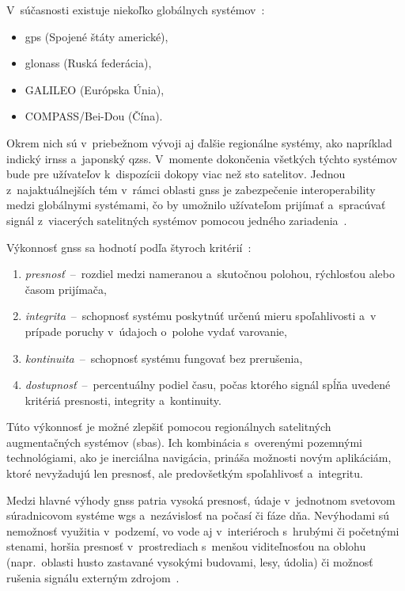     V~súčasnosti existuje niekoľko globálnych systémov~\cite{WhatGNSS}:
    \begin{itemize}
      \item \acrshort{gps} (Spojené štáty americké),
      \item \acrshort{glonass} (Ruská federácia),
      \item GALILEO (Európska Únia),
      \item COMPASS/Bei-Dou (Čína).
    \end{itemize}
    
    Okrem nich sú v~priebežnom vývoji aj ďalšie regionálne systémy, ako napríklad indický \acrshort{irnss} a~japonský \acrshort{qzss}. V~momente dokončenia všetkých týchto systémov bude pre užívateľov k~dispozícii dokopy viac než sto satelitov. Jednou z~najaktuálnejších tém v~rámci oblasti \acrshort{gnss} je zabezpečenie interoperability medzi globálnymi systémami, čo by umožnilo užívateľom prijímať a~spracúvať signál z~viacerých satelitných systémov pomocou jedného zariadenia~\cite{GNSS}.

    Výkonnosť \acrshort{gnss} sa hodnotí podľa štyroch kritérií~\cite{WhatGNSS}:
    \begin{enumerate}
      \item \emph{presnosť}~--~rozdiel medzi nameranou a~skutočnou polohou, rýchlosťou alebo časom prijímača,
      \item \emph{integrita}~--~schopnosť systému poskytnúť určenú mieru spoľahlivosti a~v prípade poruchy v~údajoch o~polohe vydať varovanie,
      \item \emph{kontinuita}~--~schopnosť systému fungovať bez prerušenia,
      \item \emph{dostupnosť}~--~percentuálny podiel času, počas ktorého signál spĺňa uvedené kritériá presnosti, integrity a~kontinuity.
    \end{enumerate}

    Túto výkonnosť je možné zlepšiť pomocou regionálnych satelitných augmentačných systémov (\acrshort{sbas}). Ich kombinácia s~overenými pozemnými technológiami, ako je inerciálna navigácia, prináša možnosti novým aplikáciám, ktoré nevyžadujú len presnosť, ale predovšetkým spoľahlivosť a~integritu.

    Medzi hlavné výhody \acrshort{gnss} patria vysoká presnosť, údaje v~jednotnom svetovom súradnicovom systéme \acrshort{wgs} a~nezávislosť na počasí či fáze dňa. Nevýhodami sú nemožnosť využitia v~podzemí, vo vode aj v~interiéroch s~hrubými či početnými stenami, horšia presnosť v~prostrediach s~menšou viditeľnosťou na oblohu (napr.\ oblasti husto zastavané vysokými budovami, lesy, údolia) či možnosť rušenia signálu externým zdrojom~\cite{duchonSnimaceMobilnejRobotike2012}.
    
